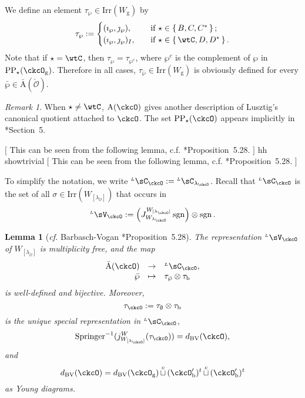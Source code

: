 \documentclass[12pt,a4paper]{amsart}
\newcommand{\trivial}[2][]{\if\relax\detokenize{#1}\relax
  {%
      \color{orange} \vspace{0em} $[$  #2 $]$
      \color{black}
  }
  \else
\ifx#1h
\ifcsname showtrivial\endcsname
{%
    \color{orange} \vspace{0em}  $[$ #2 $]$
    \color{black}
}
\fi
\else {\red Wrong argument!} \fi
\fi
}
\newcommand{\CO}{{\mathcal {O}}}
\newcommand{\sgn}{\operatorname{sgn}}
\numberwithin{equation}{section}
\newtheorem{lem}[thm]{Lemma}
\theoremstyle{remark}
\newtheorem{remark}[thm]{Remark}
\def\cf{\emph{cf.} }
\def\Irr{\mathrm{Irr}}
\def\dBV{d_{\mathrm{BV}}}
\def\lamck{\lambda_\ckcO}
\def\WLamck{W_{[\lambda_{\ckcO}]}}
\def\Wlamck{W_{\lamck}}
\def\LV{{}^{\scriptscriptstyle L}\sV}
\def\LC{{}^{\scriptscriptstyle L}\sC}
\def\LV{{}^{\scriptscriptstyle L}\sV}
\def\Wg{W_{\mathrm g}}
\def\cupcol{{\stackrel{c}{\sqcup}}}
\def\Spr{\mathrm{Springer}}
\def\imathp{\imath_{\wp}}
\def\jmathp{\jmath_{\wp}}
\def\CPP{\mathrm{PP}}
\def\CPPs{\mathrm{PP}_{\star}}
\def\cupcol{{\,\stackrel{c}{\sqcup}\,}}
\def\ckcOpb{\ckcO'_{\mathrm b}}
\def\ckcOg{\ckcO_{\mathrm g}}
\begin{document}
We define an element $\tau_{\wp}\in \Irr(\Wg)$ by
  \begin{equation}\label{eq:tauwp}
    \tau_{\wp} :=
    \begin{cases}
      (\imathp,\jmathp),  & \quad \text{if } \star \in \set{B,C, C^{*} }; \\
      (\imathp,\jmathp)_{I},  & \quad \text{if } \star \in \set{\wtC,D,D^{*}}.
    \end{cases}
  \end{equation}
  Note that  if $\star=\wtC$, then $\tau_{\wp} = \tau_{\wp^{c}}$, where $\wp^{c}$ is the complement of $\wp$ in $\CPPs(\ckcO_{\mathrm g})$.
Therefore in all cases,   $\tau_{\bar \wp}\in \Irr(\Wg)$ is obviously defined for every $\bar \wp\in \bar{\mathrm A}(\check \CO)$.



\begin{remark} When $\star\neq \wtC$, $\mathrm A(\ckcO)$ gives another description of Lusztig's canonical
  quotient attached to $\ckcO$. The set $\CPP_{\star}(\ckcO)$ appears implicitly in
\cite{So}*{Section~5}.

  \trivial[h]{ This can be seen from the following
    lemma, c.f. \cite{BVUni}*{Proposition~5.28}. }
\end{remark}

  To simplify the notation, we write $\LC_{\ckcO}:= \LC_{\lambda_{\ckcO}}$. Recall that $\LC_{\ckcO}$ is the set of all $\sigma\in \Irr(W_{[\lambda_{\check \CO}]})$  that occurs in  \[
    \LV_{\ckcO}:= \left(J_{\Wlamck}^{\WLamck} \sgn\right) \otimes \sgn.
  \]


  \begin{lem}[\cf Barbasch-Vogan {\cite{BVUni}*{Proposition~5.28}}]
    \label{lem:Lcell}
    The representation   $\LV_{\ckcO}$ of $W_{[\lambda_{\check \CO}]}$ is multiplicity free, and  the
  map    \[
      \begin{array}{rcl}
        \bar{\mathrm A}(\ckcO) & \rightarrow & \LC_{\ckcO},\\
                       \bar \wp & \mapsto & \tau_{\bar \wp} \otimes \tau_{\mathrm b}
      \end{array}
    \]
    is well-defined and bijective.
    Moreover,
    \[
      \tau_{\ckcO}:=\tau_{\emptyset}\otimes \tau_{\mathrm b}
    \] is the unique special representation in $\LC_{\ckcO}$,
    \begin{equation}\label{eq:dBV.W}
      \Spr ^{-1}(j_{\WLamck}^{W}(\tau_{\ckcO}))
      = \dBV(\ckcO),
       \end{equation}
      and
  \begin{equation}\label{eq:dBV.W2}
     \dBV(\ckcO)=  \dBV(\ckcOg) \cupcol (\ckcOpb)^{t} \cupcol (\ckcOpb)^{t}
   \end{equation}
as Young diagrams.
        \end{lem}
\end{document}
